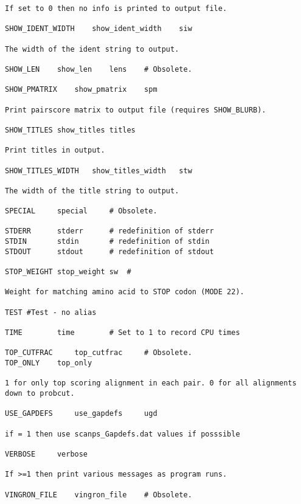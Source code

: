 \documentclass[12pt]{article}
\begin{document}
\begin{scriptsize}
\begin{verbatim}
If set to 0 then no info is printed to output file.

SHOW_IDENT_WIDTH	show_ident_width	siw	

The width of the ident string to output.

SHOW_LEN	show_len	lens	# Obsolete.

SHOW_PMATRIX 	show_pmatrix	spm	

Print pairscore matrix to output file (requires SHOW_BLURB).

SHOW_TITLES	show_titles	titles	

Print titles in output.

SHOW_TITLES_WIDTH	show_titles_width	stw

The width of the title string to output.

SPECIAL		special		# Obsolete.

STDERR		stderr		# redefinition of stderr
STDIN		stdin		# redefinition of stdin
STDOUT		stdout		# redefinition of stdout

STOP_WEIGHT	stop_weight	sw  # 

Weight for matching amino acid to STOP codon (MODE 22).

TEST #Test - no alias

TIME		time		# Set to 1 to record CPU times

TOP_CUTFRAC     top_cutfrac     # Obsolete.
TOP_ONLY	top_only	

1 for only top scoring alignment in each pair. 0 for all alignments
down to probcut.

USE_GAPDEFS     use_gapdefs     ugd  

if = 1 then use scanps_Gapdefs.dat values if posssible

VERBOSE		verbose		

If >=1 then print various messages as program runs.

VINGRON_FILE	vingron_file	# Obsolete.

\end{verbatim}
\end{scriptsize}
\end{document}
